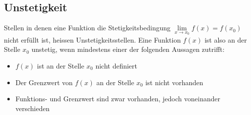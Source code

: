 \subsection{Unstetigkeit}
Stellen in denen eine Funktion die Stetigkeitsbedingung \(\lim\limits_{x \rightarrow x_0}{f(x)} = f(x_0)\) nicht erfüllt ist, heissen Unstetigkeitsstellen.
\newline Eine Funktion \(f(x)\) ist also an der Stelle \(x_0\) unstetig, wenn mindestens einer der folgenden Aussagen zutrifft:
\begin{itemize}
	\item \(f(x)\) ist an der Stelle \(x_0\) nicht definiert
	\item Der Grenzwert von \(f(x)\) an der Stelle \(x_0\) ist nicht vorhanden
	\item Funktions- und Grenzwert sind zwar vorhanden, jedoch voneinander verschieden
\end{itemize}